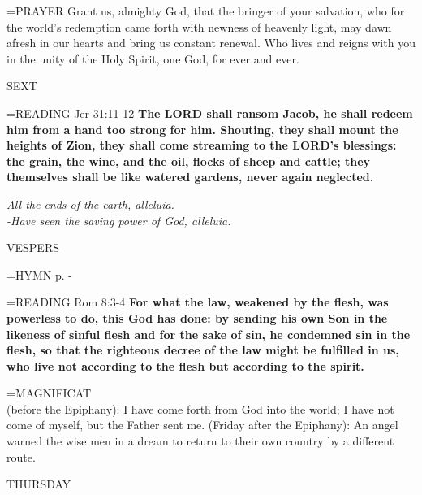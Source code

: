 \hangindent=\parindent \small{PRAYER 	Grant us, almighty God, that the bringer of your salvation, who for the world's redemption came forth with newness of heavenly light, may dawn afresh in our hearts and bring us constant renewal. Who lives and reigns with you in the unity of the Holy Spirit, one God, for ever and ever.}

\begin{flushleft}\normalsize SEXT\\\end{flushleft}

\hangindent=\parindent \small{\uppercase{READING}}    Jer 31:11-12 \textbf{   The LORD shall ransom Jacob, he shall redeem him from a hand too strong for him. Shouting, they shall mount the heights of Zion, they shall come streaming to the LORD’s blessings: the grain, the wine, and the oil, flocks of sheep and cattle; they themselves shall be like watered gardens, never again neglected.\\}

\begin{center}
\textit{All the ends of the earth, alleluia.\\
-Have seen the saving power of God, alleluia.}
\end{center}

\begin{flushleft}\normalsize VESPERS\\\end{flushleft}

\hangindent=\parindent \small{\uppercase{HYMN} p. \pageref{christmas:firstHymn}-\pageref{christmas:lastHymn}\\}

\hangindent=\parindent \small{\uppercase{READING}}    Rom 8:3-4 \textbf{   For what the law, weakened by the flesh, was powerless to do, this God has done: by sending his own Son in the likeness of sinful flesh and for the sake of sin, he condemned sin in the flesh, so that the righteous decree of the law might be fulfilled in us, who live not according to the flesh but according to the spirit.\\}

\hangindent=\parindent \small{MAGNIFICAT \\}
(before the Epiphany): I have come forth from God into the world; I have not come of myself, but the Father sent me.
(Friday after the Epiphany): An angel warned the wise men in a dream to return to their own country by a different route.


\begin{center}
\normalsize THURSDAY
\end{center}

